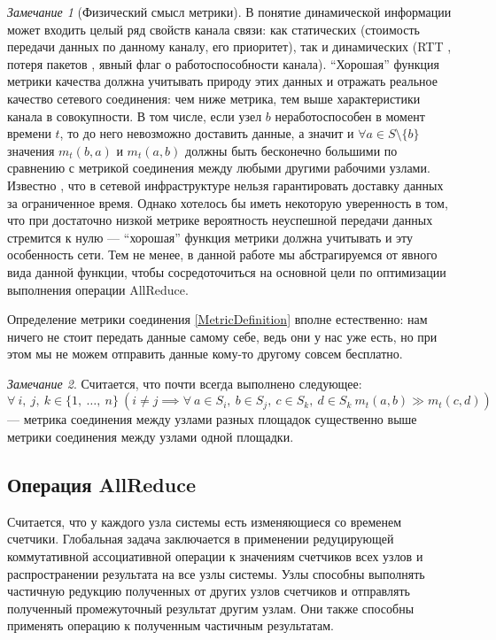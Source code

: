 \documentclass{article}
\theoremstyle{plain}
\theoremstyle{plain}
\theoremstyle{plain}
\theoremstyle{plain}
\theoremstyle{definition}
\theoremstyle{remark}
\newtheorem{remark}{Замечание}[section]
\theoremstyle{plain}
\begin{document}
\begin{remark}[Физический смысл метрики]
\label{MetricPhysicalMeaning}
    В понятие динамической информации может входить целый ряд свойств канала связи: как статических (стоимость передачи данных по данному каналу, его приоритет), так и динамических (RTT \cite{definition:round-trip_delay_time}, потеря пакетов \cite{RFC1242}, явный флаг о работоспособности канала). \enquote{Хорошая} функция метрики качества должна учитывать природу этих данных и отражать реальное качество сетевого соединения: чем ниже метрика, тем выше характеристики канала в совокупности. В том числе, если узел $b$ неработоспособен в момент времени $t$, то до него невозможно доставить данные, а значит и $\forall a \in S \setminus \{ b \}$ значения $m_t(b, a)$ и $m_t(a, b)$ должны быть бесконечно большими по сравнению с метрикой соединения между любыми другими рабочими узлами. Известно \cite{networking:best-effort-service}, что в сетевой инфраструктуре нельзя гарантировать доставку данных за ограниченное время. Однако хотелось бы иметь некоторую уверенность в том, что при достаточно низкой метрике вероятность неуспешной передачи данных стремится к нулю --- \enquote{хорошая} функция метрики должна учитывать и эту особенность сети. Тем не менее, в данной работе мы абстрагируемся от явного вида данной функции, чтобы сосредоточиться на основной цели по оптимизации выполнения операции AllReduce.
\end{remark}

Определение метрики соединения \ref{MetricDefinition} вполне естественно: нам ничего не стоит передать данные самому себе, ведь они у нас уже есть, но при этом мы не можем отправить данные кому-то другому совсем бесплатно.

\begin{remark}
\label{MetricEmpiricalRule}
    Считается, что почти всегда выполнено следующее: 
    \[
        \forall\ i,\ j,\ k \in \{1,\ \ldots,\ n\}\ ( i \neq j \implies \forall\ a \in S_i,\ b \in S_j,\ c \in S_k,\ d \in S_k\ m_t(a, b) \gg m_t(c, d))
    \] --- метрика соединения между узлами разных площадок существенно выше метрики соединения между узлами одной площадки.
\end{remark}

\subsection{Операция AllReduce}

Считается, что у каждого узла системы есть изменяющиеся со временем счетчики. Глобальная задача заключается в применении редуцирующей коммутативной ассоциативной операции к значениям счетчиков всех узлов и распространении результата на все узлы системы. Узлы способны выполнять частичную редукцию полученных от других узлов счетчиков и отправлять полученный промежуточный результат другим узлам. Они также способны применять операцию к полученным частичным результатам.
\end{document}
